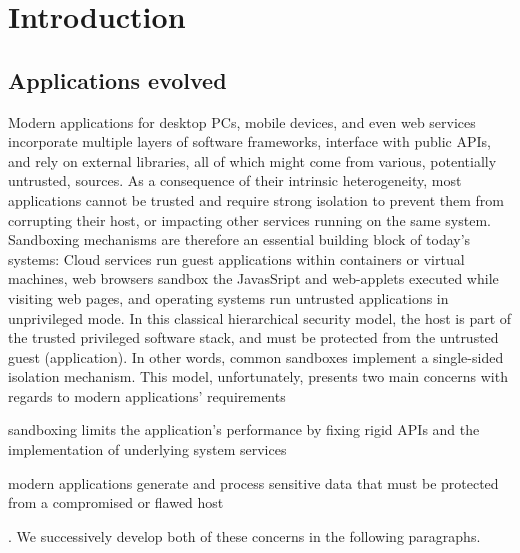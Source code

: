 \section{Introduction}

%	
%	

\subsection{Applications evolved}

Modern applications for desktop PCs, mobile devices, and even web services incorporate multiple layers of software frameworks, interface with public APIs, and rely on external libraries, all of which might come from various, potentially untrusted, sources.
As a consequence of their intrinsic heterogeneity, most applications cannot be trusted and require strong isolation to prevent them from corrupting their host, or impacting other services running on the same system.
Sandboxing mechanisms are therefore an essential building block of today's systems: Cloud services run guest applications within containers or virtual machines, web browsers sandbox the JavasSript and web-applets executed while visiting web pages, and operating systems run untrusted applications in unprivileged mode.
In this classical hierarchical security model, the host is part of the trusted privileged software stack, and must be protected from the untrusted guest (application).
In other words, common sandboxes implement a single-sided isolation mechanism.
This model, unfortunately, presents two main concerns with regards to modern applications' requirements
\begin{enumerate*}
	\item sandboxing limits the application's performance by fixing rigid APIs and the implementation of underlying system services
	\item modern applications generate and process sensitive data that must be protected from a compromised or flawed host
\end{enumerate*}.
We successively develop both of these concerns in the following paragraphs.


